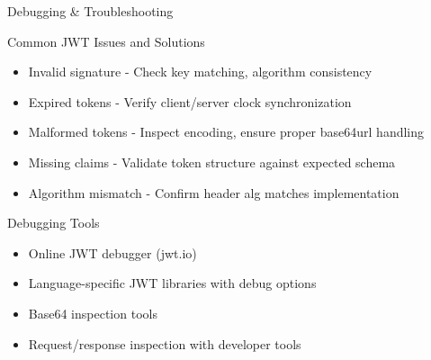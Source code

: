 \documentclass[presentation,aspectratio=169]{beamer}
\begin{document}
\begin{frame}[label={sec:orga51283f}]{Debugging \& Troubleshooting}
\begin{block}{Common JWT Issues and Solutions}
\begin{itemize}[<+->]
\item \alert{Invalid signature} - Check key matching, algorithm consistency
\item \alert{Expired tokens} - Verify client/server clock synchronization
\item \alert{Malformed tokens} - Inspect encoding, ensure proper base64url handling
\item \alert{Missing claims} - Validate token structure against expected schema
\item \alert{Algorithm mismatch} - Confirm header alg matches implementation
\end{itemize}
\end{block}
\begin{block}{Debugging Tools}
\begin{itemize}[<+->]
\item Online JWT debugger (jwt.io)
\item Language-specific JWT libraries with debug options
\item Base64 inspection tools
\item Request/response inspection with developer tools
\end{itemize}
\end{block}
\end{frame}
\end{document}
